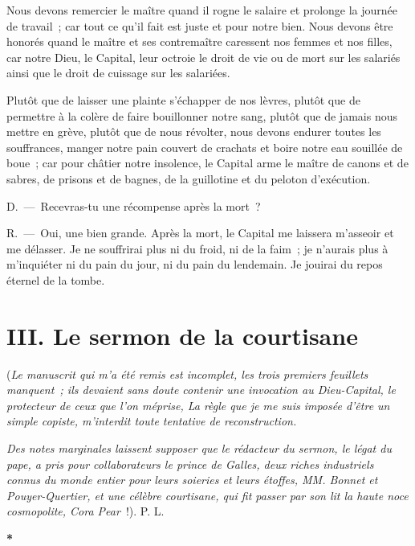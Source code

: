 \documentclass[french,twoside]{book} %
\newcommand\chapteropen{} %
\newcommand\chaptercont{} %
\newcommand\chapterclose{} %
\begin{document}
Nous devons remercier le maître quand il rogne le salaire et prolonge la journée de travail ; car tout ce qu’il fait est juste et pour notre bien. Nous devons être honorés quand le maître et ses contremaître caressent nos femmes et nos filles, car notre Dieu, le Capital, leur octroie le droit de vie ou de mort sur les salariés ainsi que le droit de cuissage sur les salariées.\par
Plutôt que de laisser une plainte s’échapper de nos lèvres, plutôt que de permettre à la colère de faire bouillonner notre sang, plutôt que de jamais nous mettre en grève, plutôt que de nous révolter, nous devons endurer toutes les souffrances, manger notre pain couvert de crachats et boire notre eau souillée de boue ; car pour châtier notre insolence, le Capital arme le maître de canons et de sabres, de prisons et de bagnes, de la guillotine et du peloton d’exécution.\par
D. — Recevras-tu une récompense après la mort ?\par
R. — Oui, une bien grande. Après la mort, le Capital me laissera m’asseoir et me délasser. Je ne souffrirai plus ni du froid, ni de la faim ; je n’aurais plus à m’inquiéter ni du pain du jour, ni du pain du lendemain. Je jouirai du repos éternel de la tombe.
\chapterclose


\chapteropen

\chapter[{III. Le sermon de la courtisane}]{III. Le sermon de la courtisane}
\renewcommand{\leftmark}{III. Le sermon de la courtisane}


\chaptercont
\noindent (\emph{Le manuscrit qui m’a été remis est incomplet, les trois premiers feuillets manquent ; ils devaient sans doute contenir une invocation au Dieu-Capital, le protecteur de ceux que l’on méprise, La règle que je me suis imposée d’être un simple copiste, m’interdit toute tentative de reconstruction.}\par
\emph{Des notes marginales laissent supposer que le rédacteur du sermon, le légat du pape, a pris pour collaborateurs le prince de Galles, deux riches industriels connus du monde entier pour leurs soieries et leurs étoffes, MM. Bonnet et Pouyer-Quertier, et une célèbre courtisane, qui fit passer par son lit la haute noce cosmopolite, Cora Pear} !). P. L.\par

\begin{center}
\noindent \textbf{*}\par
\end{center}
\end{document}
